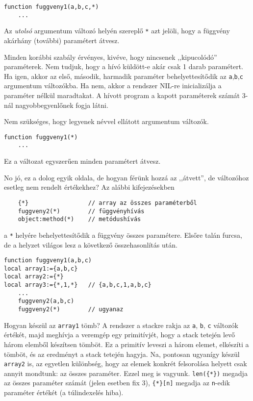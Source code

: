 \begin{verbatim}
function fuggveny1(a,b,c,*)
    ...
\end{verbatim}
Az {\em utolsó\/} argumentum változó helyén szereplő \verb!*! azt jelöli,
hogy a függvény akárhány (további) paramétert átvesz. 

Minden korábbi szabály érvényes, kivéve, hogy nincsenek ,,kipucolódó''
paraméterek.  Nem tudjuk, hogy a hívó küldött-e akár csak 1 darab paramétert.
Ha igen, akkor az első, második, harmadik paraméter behelyettesítődik az
\verb!a!,\verb!b!,\verb!c! argumentum változókba. Ha nem, akkor a rendszer
NIL-re inicializálja a paraméter nélkül maradtakat. 
A hívott program a kapott paraméterek számát 3-nál nagyobbegyenlőnek fogja látni.

Nem szükséges, hogy legyenek névvel ellátott argumentum változók.
\begin{verbatim}
function fuggveny1(*)
    ...
\end{verbatim}
Ez a változat egyszerűen minden paramétert átvesz.

No jó, ez a dolog egyik oldala, de hogyan férünk hozzá az ,,átvett'', 
de változóhoz esetleg nem rendelt értékekhez? Az alábbi kifejezésekben
\begin{verbatim}
    {*}                 // array az összes paraméterből
    fuggveny2(*)        // függvényhívás
    object:method(*)    // metódushívás
\end{verbatim}
a \verb!*! helyére behelyettesítődik a függvény összes paramétere. Elsőre 
talán furcsa, de a helyzet világos lesz a következő összehasonlítás után. 
\begin{verbatim}
function fuggveny1(a,b,c)
local array1:={a,b,c}
local array2:={*}
local array3:={*,1,*}   // {a,b,c,1,a,b,c}
    ...
    fuggveny2(a,b,c)
    fuggveny2(*)        // ugyanaz
\end{verbatim}
Hogyan készül az \verb!array1! tömb? A rendszer a stackre rakja az 
\verb!a!, \verb!b!, \verb!c! változók értékét, majd meghívja a veremgép
egy primitívjét, hogy a stack tetején levő három elemből készítsen tömböt.
Ez a primitív leveszi a három elemet, elkészíti a tömböt, és az eredményt
a stack tetején hagyja. Na, pontosan ugyanígy készül \verb!array2! is,
az egyetlen különbség, hogy az elemek konkrét felsorolása helyett
csak annyit mondtunk: az összes paraméter. Ezzel meg is vagyunk.
\verb!len({*})! megadja az összes paraméter számát (jelen esetben fix 3), 
\verb!{*}[n]! megadja az \verb!n!-edik paraméter értékét (a túlindexelés hiba).

